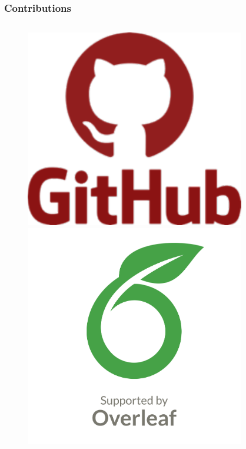 \documentclass[ignorenonframetext,9pt,allowframebreaks,aspectratio=169]{beamer}
\begin{document}
\begin{frame}
  \frametitle{Contributions}
  \begin{columns}
  \begin{column}{0.1\textwidth}
      \begin{figure}
             \centering
             \includegraphics[width=0.9\textwidth]{../Latex/Sources/EDU/SRC1/Contribs/contribute/ContribPictures/github.pdf}
              \includegraphics[width=0.9\textwidth]{../Latex/Sources/EDU/SRC1/Contribs/contribute/ContribPictures/overleaf.png}
   \end{figure}
  \end{column}
  \begin{column}{0.8\textwidth}
             
  \end{column}
  \end{columns}
  \end{frame}
  
\end{document}
